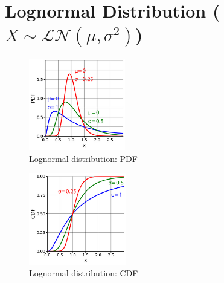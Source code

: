 \chapter{Lognormal Distribution ($X \sim \mathcal{LN}(\mu, \sigma^2)$) \cite{ism-1,wiki/Log-normal_distribution}} \label{Lognormal Distribution}

\begin{table}[H]
    \begin{minipage}{0.49\linewidth}
        \begin{figure}[H]
            \centering
            \includegraphics[width=\linewidth, height=4cm, keepaspectratio]{Pictures/distributions/Log-normal-pdfs.png}
            \caption{Lognormal distribution: PDF}
        \end{figure}
    \end{minipage}
    \hfill
    \begin{minipage}{0.49\linewidth}
        \begin{figure}[H]
            \centering
            \includegraphics[width=\linewidth, height=4cm, keepaspectratio]{Pictures/distributions/Log-normal-cdfs.png}
            \caption{Lognormal distribution: CDF}
        \end{figure}
    \end{minipage}
\end{table}


